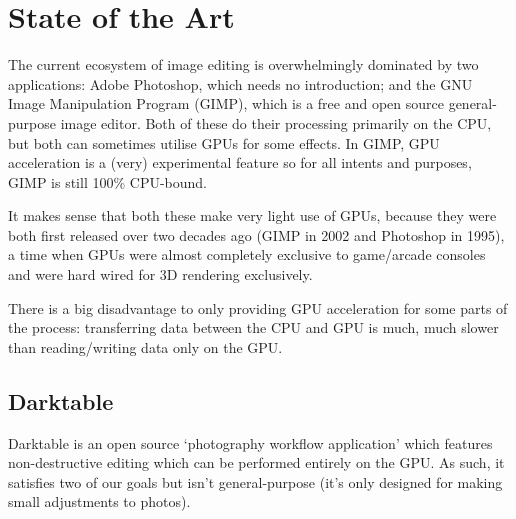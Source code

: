\documentclass[12pt]{article}
\begin{document}
\pagebreak

\section{State of the Art}

The current ecosystem of image editing is overwhelmingly dominated by two applications: Adobe
Photoshop, which needs no introduction; and the GNU Image Manipulation Program (GIMP), which is a
free and open source general-purpose image editor.  Both of these do their processing primarily on
the CPU, but both can sometimes utilise GPUs for some effects.  In GIMP, GPU acceleration is a
(very) experimental feature so for all intents and purposes, GIMP is still 100\% CPU-bound.

It makes sense that both these make very light use of GPUs, because they were both first released
over two decades ago (GIMP in 2002 and Photoshop in 1995), a time when GPUs were almost completely
exclusive to game/arcade consoles and were hard wired for 3D rendering exclusively.

There is a big disadvantage to only providing GPU acceleration for some parts of the process:
transferring data between the CPU and GPU is much, much slower than reading/writing data only on the
GPU.

\subsection{Darktable}

Darktable is an open source `photography workflow application' which features non-destructive
editing which can be performed entirely on the GPU.  As such, it satisfies two of our goals but
isn't general-purpose (it's only designed for making small adjustments to photos).
\end{document}
